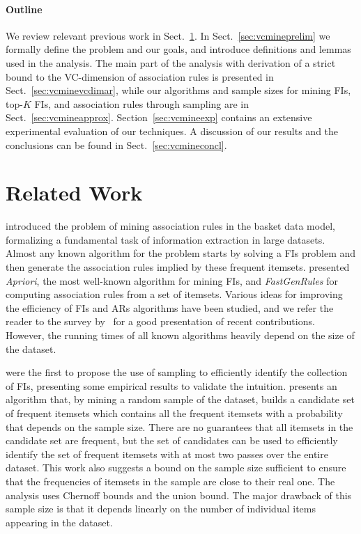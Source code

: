 \paragraph{Outline}
We review relevant previous work in Sect.~\ref{sec:vcmineprevwork}. In
Sect.~\ref{sec:vcmineprelim} we formally define the problem
and our goals, and introduce definitions and lemmas used in the analysis. The
main part of the analysis with derivation of a strict bound to the VC-dimension
of association rules is presented in Sect.~\ref{sec:vcminevcdimar}, while our
algorithms and sample sizes for mining FIs, top-$K$ FIs, and association rules
through sampling are in Sect.~\ref{sec:vcmineapprox}. Section~\ref{sec:vcmineexp} contains
an extensive experimental evaluation of our techniques. A discussion of our
results and the conclusions can be found in Sect.~\ref{sec:vcmineconcl}.

\section{Related Work}\label{sec:vcmineprevwork}
\citet{AgrawalIS93} introduced the problem of mining association
rules in the basket data model, formalizing a fundamental task of information
extraction in large datasets. Almost any known algorithm for the problem starts
by solving a FIs problem and then generate the association rules implied by
these frequent itemsets. \citet{AgrawalS94} presented
\emph{Apriori}, the most well-known algorithm for mining FIs, and
\emph{FastGenRules} for computing association rules from a set of itemsets.
Various ideas for improving the efficiency of FIs and ARs algorithms have been
studied, and we refer the reader to the survey by~\citet{CeglarR06} for a good presentation of recent contributions.
However, the running times of all known algorithms heavily depend on the size of
the dataset.  

\citet{MannilaTV94} were the first to propose the 
use of sampling to efficiently identify the collection of FIs, presenting some empirical
results to validate the intuition. \citet{Toivonen96} presents an
algorithm that, by mining a random sample of the dataset, builds a candidate set
of frequent itemsets which contains all the frequent itemsets with a probability
that depends on the sample size. There are no guarantees that all itemsets
in the candidate set are frequent, but the set of candidates can be used to
efficiently identify the set of frequent itemsets with at most two passes over
the entire dataset. This work also suggests a bound on the sample size sufficient
to ensure that the frequencies of itemsets in the sample are close to their real
one. The analysis uses Chernoff bounds and the union bound. The major drawback
of this sample size is that it depends linearly on the number of individual
items appearing in the dataset.

